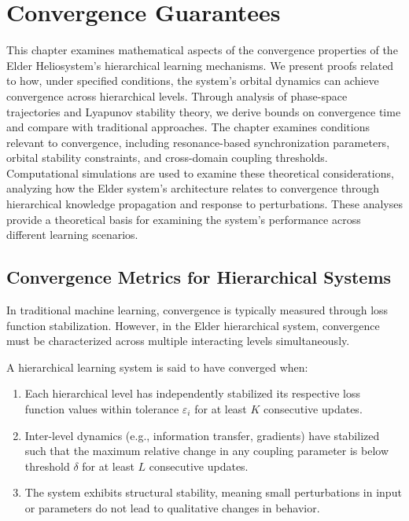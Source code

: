 \chapter{Convergence Guarantees}

\begin{tcolorbox}[colback=DarkSkyBlue!5!white,colframe=DarkSkyBlue!75!black,title=Chapter Summary]
This chapter examines mathematical aspects of the convergence properties of the Elder Heliosystem's hierarchical learning mechanisms. We present proofs related to how, under specified conditions, the system's orbital dynamics can achieve convergence across hierarchical levels. Through analysis of phase-space trajectories and Lyapunov stability theory, we derive bounds on convergence time and compare with traditional approaches. The chapter examines conditions relevant to convergence, including resonance-based synchronization parameters, orbital stability constraints, and cross-domain coupling thresholds. Computational simulations are used to examine these theoretical considerations, analyzing how the Elder system's architecture relates to convergence through hierarchical knowledge propagation and response to perturbations. These analyses provide a theoretical basis for examining the system's performance across different learning scenarios.
\end{tcolorbox}

\section{Convergence Metrics for Hierarchical Systems}



In traditional machine learning, convergence is typically measured through loss function stabilization. However, in the Elder hierarchical system, convergence must be characterized across multiple interacting levels simultaneously.

\begin{definition}
A hierarchical learning system is said to have converged when:
\begin{enumerate}
    \item Each hierarchical level has independently stabilized its respective loss function values within tolerance $\varepsilon_i$ for at least $K$ consecutive updates.
    \item Inter-level dynamics (e.g., information transfer, gradients) have stabilized such that the maximum relative change in any coupling parameter is below threshold $\delta$ for at least $L$ consecutive updates.
    \item The system exhibits structural stability, meaning small perturbations in input or parameters do not lead to qualitative changes in behavior.
\end{enumerate}
\end{definition}

